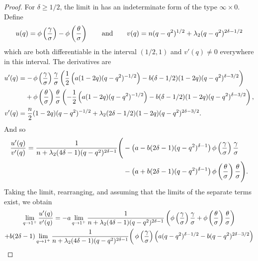 \begin{proof}
  For \(\delta \geq 1/2\), the limit in  has an indeterminate form of the type \(\infty \times 0\). Define
  \[
    u(q) = \operatorname{\phi}\left(\frac{\gamma}{\sigma}\right) - \operatorname{\phi}\left(\frac{\theta}{\sigma}\right)
    \qquad\text{and}\qquad
    v(q) = n(q - q^2)^{1/2} + \lambda_2 (q - q^2)^{2\delta - 1/2}
  \]
  which are both differentiable in the interval \((1/2, 1)\) and \(v'(q) \neq 0\) everywhere in this interval. The derivatives are
  \[
    \begin{aligned}
      u'(q) & = -\pdf\left(\frac{\gamma}{\sigma}\right)\frac{\gamma}{\sigma} \left(\frac{1}{2}\left(a(1-2q)(q - q^2)^{-1/2}\right) - b(\delta - 1/2)(1- 2q)(q - q^2)^{\delta - 3/2}\right)                  \\
            & \phantom{= {}} + \pdf\left(\frac{\theta}{\sigma}\right) \frac{\theta}{\sigma} \left(-\frac{1}{2}\left(a(1-2q)(q - q^2)^{-1/2}\right) - b(\delta - 1/2)(1- 2q)(q - q^2)^{\delta - 3/2}\right), \\
      v'(q) & = \frac{n}{2} (1 - 2q)(q - q^2)^{-1/2} + \lambda_2(2\delta - 1/2)(1 - 2q)(q - q^2)^{2\delta - 3/2}.
    \end{aligned}
  \]
  And so
  \begin{equation}
    \begin{split}
      \frac{u'(q)}{v'(q)} = \frac{1}{n + \lambda_2(4\delta - 1)(q - q^2)^{2\delta - 1}}  \Bigg( & -\left(a - b(2\delta - 1)(q - q^2)^{\delta - 1}\right) \operatorname{\phi}\left(\frac{\gamma}{\sigma}\right) \frac{\gamma}{\sigma} \\ & - \left(a + b(2\delta - 1)(q - q^2)^{\delta - 1}\right)\operatorname{\phi}\left(\frac{\theta}{\sigma}\right) \frac{\theta}{\sigma}\Bigg).
    \end{split}
  \end{equation}
  Taking the limit, rearranging, and assuming that the limits of the separate terms exist, we obtain
  \begin{multline}
    \label{eq:eval-qlimit-pdfterm-split}
    \lim_{q \rightarrow 1^+} \frac{u'(q)}{v'(q)} = - a \lim_{q \rightarrow 1^+}  \frac{1}{n + \lambda_2 (4 \delta - 1)(q - q^2)^{2\delta - 1}} \left( \pdf\left(\frac{\gamma}{\sigma}\right)\frac{\gamma}{\sigma} + \pdf\left(\frac{\theta}{\sigma}\right)\frac{\theta}{\sigma}\right) \\
    + b (2\delta - 1) \lim_{q \rightarrow 1^+} \frac{1}{n + \lambda_2 (4 \delta - 1)(q - q^2)^{2\delta - 1}} \bigg( \pdf\left(\frac{\gamma}{\sigma}\right) \left(a(q -q^2)^{\delta - 1/2}- b(q - q^2)^{2\delta - 3/2} \right) \\

\end{multline}
\end{proof}

